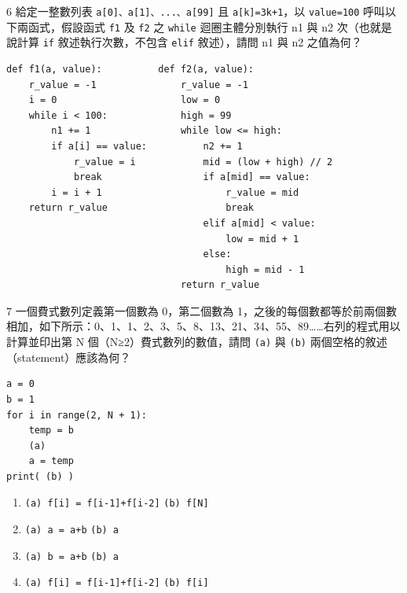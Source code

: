 \begin{qbox}{6}
給定一整數列表 \texttt{a[0]、a[1]、...、a[99]} 且 \texttt{a[k]=3k+1}，以 \texttt{value=100} 呼叫以下兩函式，假設函式 \texttt{f1} 及 \texttt{f2} 之 \texttt{while} 迴圈主體分別執行 n1 與 n2 次（也就是說計算 \texttt{if} 敘述執行次數，不包含 \texttt{elif} 敘述），請問 n1 與 n2 之值為何？

\begin{verbatim}
def f1(a, value):          def f2(a, value):
    r_value = -1               r_value = -1
    i = 0                      low = 0
    while i < 100:             high = 99
        n1 += 1                while low <= high:
        if a[i] == value:          n2 += 1
            r_value = i            mid = (low + high) // 2
            break                  if a[mid] == value:
        i = i + 1                      r_value = mid
    return r_value                     break
                                   elif a[mid] < value:
                                       low = mid + 1
                                   else:
                                       high = mid - 1
                               return r_value
\end{verbatim}

\end{qbox}

\medskip

\begin{qbox}{7}
一個費式數列定義第一個數為 0，第二個數為 1，之後的每個數都等於前兩個數相加，如下所示：0、1、1、2、3、5、8、13、21、34、55、89……右列的程式用以計算並印出第 N 個（N≥2）費式數列的數值，請問 \texttt{(a)} 與 \texttt{(b)} 兩個空格的敘述（statement）應該為何？

\begin{verbatim}
a = 0
b = 1
for i in range(2, N + 1):
    temp = b
    (a)
    a = temp
print( (b) )
\end{verbatim}

\begin{enumerate}[label=(\Alph*), itemsep=3pt, topsep=1pt, leftmargin=2.2em, parsep=0pt]
  \item \texttt{(a) f[i] = f[i-1]+f[i-2]} \quad \texttt{(b) f[N]}
  \item \texttt{(a) a = a+b} \quad \texttt{(b) a}
  \item \texttt{(a) b = a+b} \quad \texttt{(b) a}
  \item \texttt{(a) f[i] = f[i-1]+f[i-2]} \quad \texttt{(b) f[i]}
\end{enumerate}
\end{qbox}

